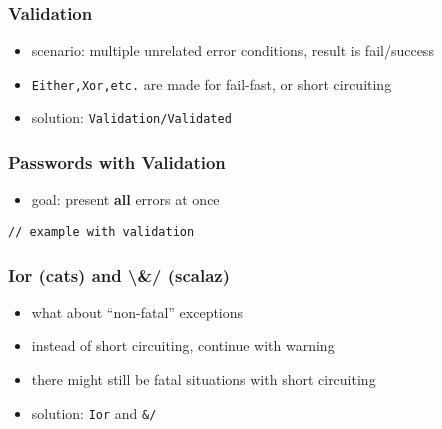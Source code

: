 \documentclass{beamer}
\begin{document}
\begin{frame}
  \frametitle{Validation}
  \begin{itemize}
  \item scenario: multiple unrelated error conditions, result is
    fail/success
  \item \texttt{Either,Xor,etc.} are made for fail-fast, or
    short circuiting
  \item solution: \texttt{Validation/Validated}
  \end{itemize}
\end{frame}

\begin{frame}[fragile]
  \frametitle{Passwords with Validation}
  \begin{itemize}
  \item goal: present \textbf{all} errors at once
  \end{itemize}
\begin{verbatim}
// example with validation
\end{verbatim}
\end{frame}

\begin{frame}
  \frametitle{Ior (cats) and \textbackslash{}\&/ (scalaz)}
  \begin{itemize}
  \item what about ``non-fatal'' exceptions
  \item instead of short circuiting, continue with warning
  \item there might still be fatal situations with short circuiting
  \item solution: \texttt{Ior} and \texttt{\&/}
  \end{itemize}
\end{frame}
\end{document}

